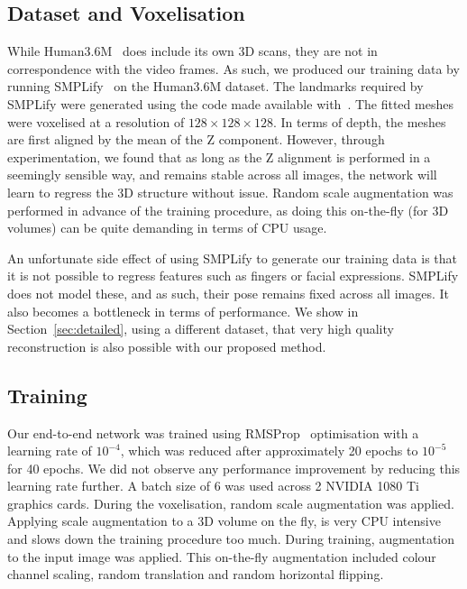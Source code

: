 \subsection{Dataset and Voxelisation}

While Human3.6M~\cite{IonescuSminchisescu11,h36m_pami} does include
its own 3D scans, they are not in correspondence with the video
frames. As such, we produced our training data by running
SMPLify~\cite{bogo2016smplify} on the Human3.6M dataset. The landmarks
required by SMPLify were generated using the code made available
with~\cite{bulat2016human}. The fitted meshes were voxelised at a
resolution of $128\times 128 \times 128$. In terms of depth, the
meshes are first aligned by the mean of the Z component. However,
through experimentation, we found that as long as the Z alignment is
performed in a seemingly sensible way, and remains stable across all
images, the network will learn to regress the 3D structure without
issue. Random scale augmentation was performed in advance of the
training procedure, as doing this on-the-fly (for 3D volumes) can be
quite demanding in terms of CPU usage.

An unfortunate side effect of using SMPLify to generate our training
data is that it is not possible to regress features such as fingers or
facial expressions. SMPLify does not model these, and as such, their
pose remains fixed across all images. It also becomes a bottleneck in
terms of performance. We show in Section~\ref{sec:detailed}, using a
different dataset, that very high quality reconstruction is also
possible with our proposed method.


\subsection{Training}

Our end-to-end network was trained using
RMSProp~\cite{hinton2012neural} optimisation with a learning rate of
$10^{-4}$, which was reduced after approximately 20 epochs to
$10^{-5}$ for 40 epochs. We did not observe any performance
improvement by reducing this learning rate further. A batch size of 6
was used across 2 NVIDIA 1080 Ti graphics cards.  During the
voxelisation, random scale augmentation was applied. Applying scale
augmentation to a 3D volume on the fly, is very CPU intensive and
slows down the training procedure too much. During training,
augmentation to the input image was applied. This on-the-fly
augmentation included colour channel scaling, random translation and
random horizontal flipping.


